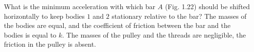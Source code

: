 \item What is the minimum acceleration with which bar \( A \) (Fig. 1.22) should be shifted horizontally to keep bodies \( 1 \) and \( 2 \) stationary relative to the bar? The masses of the bodies are equal, and the coefficient of friction between the bar and the bodies is equal to \( k \). The masses of the pulley and the threads are negligible, the friction in the pulley is absent.
    \begin{center}
    \end{center}
\begin{solution}
    \begin{center}
    \end{center}
    
\end{solution}
